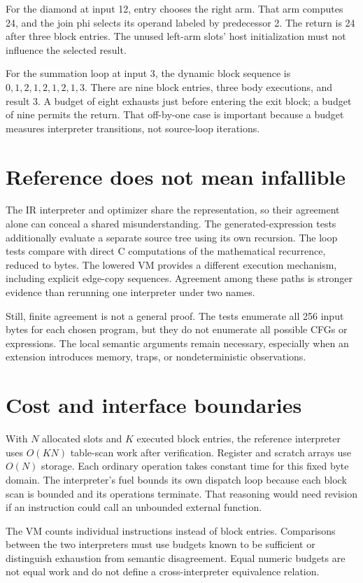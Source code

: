 For the diamond at input 12, entry chooses the right arm.
That arm computes 24, and the join phi selects its operand labeled by predecessor 2.
The return is 24 after three block entries.
The unused left-arm slots' host initialization must not influence the selected result.

For the summation loop at input 3, the dynamic block sequence is
$0,1,2,1,2,1,2,1,3$.
There are nine block entries, three body executions, and result 3.
A budget of eight exhausts just before entering the exit block; a budget of nine permits the return.
That off-by-one case is important because a budget measures interpreter transitions, not source-loop iterations.

\section{Reference does not mean infallible}
\label{sec:pebble-oracles}
The IR interpreter and optimizer share the representation, so their agreement alone can conceal a shared misunderstanding.
The generated-expression tests additionally evaluate a separate source tree using its own recursion.
The loop tests compare with direct C computations of the mathematical recurrence, reduced to bytes.
The lowered VM provides a different execution mechanism, including explicit edge-copy sequences.
Agreement among these paths is stronger evidence than rerunning one interpreter under two names.

Still, finite agreement is not a general proof.
The tests enumerate all 256 input bytes for each chosen program, but they do not enumerate all possible CFGs or expressions.
The local semantic arguments remain necessary, especially when an extension introduces memory, traps, or nondeterministic observations.

\section{Cost and interface boundaries}
\label{sec:pebble-run-cost}
With $N$ allocated slots and $K$ executed block entries, the reference interpreter uses $O(KN)$ table-scan work after verification.
Register and scratch arrays use $O(N)$ storage.
Each ordinary operation takes constant time for this fixed byte domain.
The interpreter's fuel bounds its own dispatch loop because each block scan is bounded and its operations terminate.
That reasoning would need revision if an instruction could call an unbounded external function.

The VM counts individual instructions instead of block entries.
Comparisons between the two interpreters must use budgets known to be sufficient or distinguish exhaustion from semantic disagreement.
Equal numeric budgets are not equal work and do not define a cross-interpreter equivalence relation.

